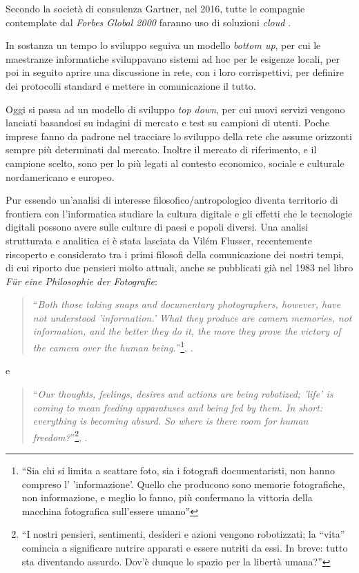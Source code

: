 Secondo la società di consulenza Gartner, nel 2016, tutte le compagnie
contemplate dal \emph{Forbes Global 2000} faranno uso di soluzioni
\emph{cloud} \citep{EY2011}.

In sostanza un tempo lo sviluppo seguiva un modello \emph{bottom up}, per
cui le maestranze informatiche sviluppavano sistemi ad hoc per le
esigenze locali, per poi in seguito aprire una discussione in rete,
con i loro corrispettivi, per definire dei protocolli standard e
mettere in comunicazione il tutto.

Oggi si passa ad un modello di sviluppo \emph{top down}, per cui nuovi
servizi vengono lanciati basandosi su indagini di mercato e test su
campioni di utenti. Poche imprese fanno da padrone nel tracciare lo
sviluppo della rete che assume orizzonti sempre più determinati dal
mercato. Inoltre il mercato di riferimento, e il campione scelto, sono
per lo più legati al contesto economico, sociale e culturale
nordamericano e europeo. 

Pur essendo un'analisi di interesse filosofico/antropologico diventa
territorio di frontiera con l'informatica studiare la cultura digitale
e gli effetti che le tecnologie digitali possono avere sulle culture
di paesi e popoli diversi. Una analisi strutturata e analitica ci è
stata lasciata da Vilém Flusser, recentemente riscoperto e considerato
tra i primi filosofi della comunicazione dei nostri tempi, di cui
riporto due pensieri molto attuali, anche se pubblicati già nel 1983
nel libro \emph{F{\"u}r eine Philosophie der Fotografie}:

\begin{quote}
  ``\emph{Both those taking snaps and documentary photographers, however,
  have not understood 'information.' What they produce are camera
  memories, not information, and the better they do it, the more they
  prove the victory of the camera over the human
  being.}''\footnote{``Sia chi si limita a scattare foto, sia i fotografi
documentaristi, non hanno compreso l' 'informazione'. Quello che
producono sono memorie fotografiche, non informazione, e meglio lo
fanno, più confermano la vittoria della macchina fotografica
sull'essere umano''}, \citet{flusser1983philosophie}.
\end{quote}

e 

\begin{quote}
  ``\emph{Our thoughts, feelings, desires and actions are being
    robotized; 'life' is coming to mean feeding apparatuses and being
    fed by them. In short: everything is becoming absurd. So where is
    there room for human freedom?}''\footnote{``I nostri pensieri,
    sentimenti, desideri e azioni vengono robotizzati; la ``vita''
    comincia a significare nutrire apparati e essere nutriti da
    essi. In breve: tutto sta diventando assurdo. Dov'è dunque lo
    spazio per la libertà umana?''}, \citet{flusser1983philosophie}.
\end{quote}

